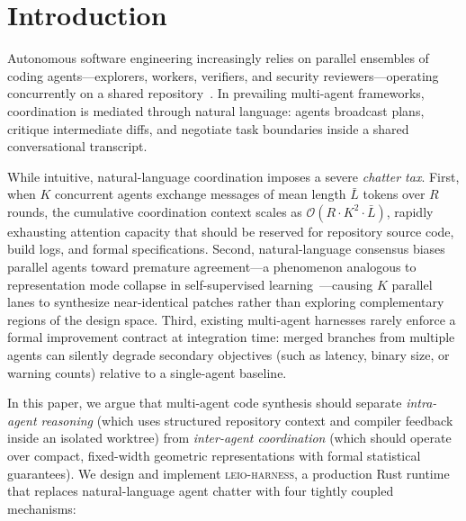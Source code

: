 \documentclass[11pt]{article}
\begin{document}
\section{Introduction}

Autonomous software engineering increasingly relies on parallel ensembles of coding agents—explorers, workers, verifiers, and security reviewers—operating concurrently on a shared repository~\cite{qian2024chatdev,hong2024metagpt,wu2024autogen,jimenez2024swebench}. In prevailing multi-agent frameworks, coordination is mediated through natural language: agents broadcast plans, critique intermediate diffs, and negotiate task boundaries inside a shared conversational transcript.

While intuitive, natural-language coordination imposes a severe \emph{chatter tax}. First, when $K$ concurrent agents exchange messages of mean length $\bar{L}$ tokens over $R$ rounds, the cumulative coordination context scales as $\mathcal{O}(R \cdot K^2 \cdot \bar{L})$, rapidly exhausting attention capacity that should be reserved for repository source code, build logs, and formal specifications. Second, natural-language consensus biases parallel agents toward premature agreement—a phenomenon analogous to representation mode collapse in self-supervised learning~\cite{jing2022understanding,klindt2025sigreg}—causing $K$ parallel lanes to synthesize near-identical patches rather than exploring complementary regions of the design space. Third, existing multi-agent harnesses rarely enforce a formal improvement contract at integration time: merged branches from multiple agents can silently degrade secondary objectives (such as latency, binary size, or warning counts) relative to a single-agent baseline.

In this paper, we argue that multi-agent code synthesis should separate \emph{intra-agent reasoning} (which uses structured repository context and compiler feedback inside an isolated worktree) from \emph{inter-agent coordination} (which should operate over compact, fixed-width geometric representations with formal statistical guarantees). We design and implement \textsc{leio-harness}, a production Rust runtime that replaces natural-language agent chatter with four tightly coupled mechanisms:
\end{document}

